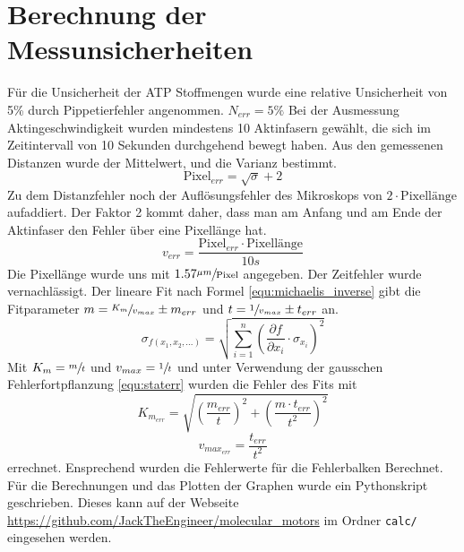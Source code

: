 \section{Berechnung der Messunsicherheiten}
Für die Unsicherheit der ATP Stoffmengen wurde eine relative Unsicherheit
von 5\% durch Pippetierfehler angenommen. $N_{err} = 5 \%$
Bei der Ausmessung Aktingeschwindigkeit wurden mindestens 10 Aktinfasern gewählt,
die sich im Zeitintervall von 10 Sekunden durchgehend bewegt haben.
Aus den gemessenen Distanzen wurde der Mittelwert, und die Varianz bestimmt.
\[
  \text{Pixel}_{err} = \sqrt{\sigma} + 2
\]
Zu dem Distanzfehler noch der Auflösungsfehler des Mikroskops
von $2 \cdot \text{Pixellänge}$ aufaddiert. Der Faktor 2 kommt daher,
dass man am Anfang und am Ende der Aktinfaser den Fehler über eine Pixellänge hat.
\[
  v_{err} = \frac{\text{Pixel}_{err} \cdot \text{Pixellänge}}{10s}
\]
Die Pixellänge wurde uns mit $1.57\sfrac{\mu m}{\text{Pixel}}$ angegeben.
Der Zeitfehler wurde vernachlässigt.
Der lineare Fit nach Formel \ref{equ:michaelis_inverse} gibt die Fitparameter
$m = \sfrac{K_m}{v_{max}} \pm m_{err}$ und $t = \sfrac{1}{v_{max}} \pm t_{err}$ an.
\begin{equation}
	\sigma_{f(x_1,x_2,...)} = \sqrt{\sum\limits_{i=1}^n (\frac{\partial f}{\partial x_i} \cdot \sigma_{x_i})^2}
	\label{equ:staterr}
\end{equation}
Mit $K_m = \sfrac{m}{t}$ und $v_{max} = \sfrac{1}{t}$ und unter Verwendung der
gausschen Fehlerfortpflanzung \ref{equ:staterr} wurden die
Fehler des Fits mit
\[
  K_{m_{err}} = \sqrt{(\frac{m_{err}}{t})^2 + (\frac{m \cdot t_{err}}{t^2})^2}
\] 
\[
  v_{max_{err}} = \frac{t_{err}}{t^2}
\]
errechnet.
Ensprechend wurden die Fehlerwerte für die Fehlerbalken Berechnet.
Für die Berechnungen und das Plotten der Graphen wurde ein Pythonskript geschrieben.
Dieses kann auf der Webseite \url{https://github.com/JackTheEngineer/molecular_motors}
im Ordner \texttt{calc/} eingesehen werden.

